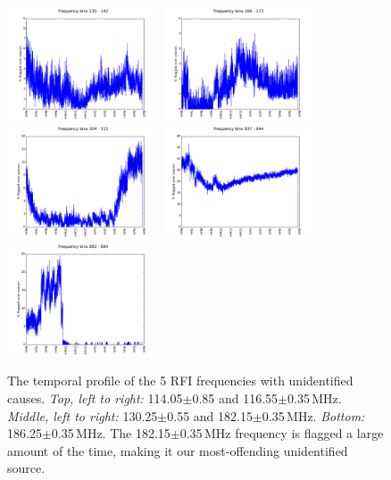 \begin{figure}[h!]
\centering
\includegraphics[width=0.4\textwidth]{chapters/data_processing/figures/FB_135_142.png}
\includegraphics[width=0.4\textwidth]{chapters/data_processing/figures/FB_166_173.png}
\includegraphics[width=0.4\textwidth]{chapters/data_processing/figures/FB_304_315.png}
\includegraphics[width=0.4\textwidth]{chapters/data_processing/figures/FB_837_844.png}
\includegraphics[width=0.4\textwidth]{chapters/data_processing/figures/FB_882_884.png}
\caption[The temporal profile of the 5 RFI frequencies with unidentified causes.]{The temporal profile of the 5 RFI frequencies with unidentified causes. \textit{Top, left to right:} 114.05$\pm$0.85 and 116.55$\pm$0.35\,MHz. \textit{Middle, left to right:} 130.25$\pm$0.55 and 182.15$\pm$0.35\,MHz. \textit{Bottom:} 186.25$\pm$0.35\,MHz. The 182.15$\pm$0.35\,MHz frequency is flagged a large amount of the time, making it our most-offending unidentified source.}
\label{fig:rfi_psa128_unidentified}
\end{figure}

